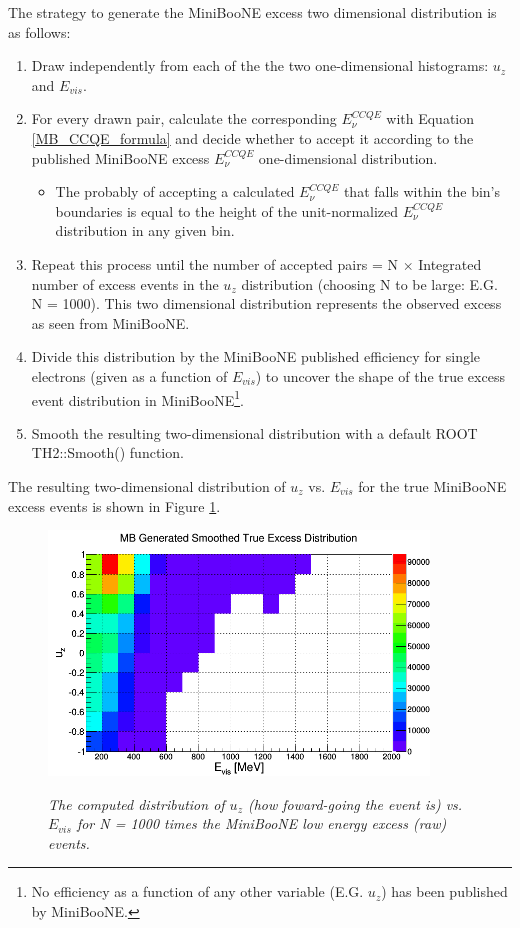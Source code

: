 The strategy to generate the MiniBooNE excess two dimensional distribution is as follows:
\begin{enumerate}
\item Draw independently from each of the the two one-dimensional histograms: $u_z$ and $E_{vis}$.
\item For every drawn pair, calculate the corresponding $E_\nu^{CCQE}$ with Equation \ref{MB_CCQE_formula} and decide whether to accept it according to the published MiniBooNE excess $E_\nu^{CCQE}$ one-dimensional distribution.
	\begin{itemize}
	\item The probably of accepting a calculated $E_\nu^{CCQE}$ that falls within the bin's boundaries is equal to the height of the unit-normalized $E_\nu^{CCQE}$ distribution in any given bin.
	\end{itemize}
\item Repeat this process until the number of accepted pairs = N $\times$ Integrated number of excess events in the $u_z$ distribution (choosing N to be large: E.G. N = 1000). This two dimensional distribution represents the observed excess as seen from MiniBooNE.
\item Divide this distribution by the MiniBooNE published efficiency for single electrons (given as a function of $E_{vis}$) to uncover the shape of the true excess event distribution in MiniBooNE\footnote{No efficiency as a function of any other variable (E.G. $u_z$) has been published by MiniBooNE.}.
\item Smooth the resulting two-dimensional distribution with a default ROOT TH2::Smooth() function.
\end{enumerate}
The resulting two-dimensional distribution of $u_z$ vs. $E_{vis}$ for the true MiniBooNE excess events is shown in Figure \ref{MBth2dfig}.


\begin{figure}[ht!]
\centering
	\includegraphics[width=0.9\textwidth]{Figures/miniboone_excess_th2d.png} \\
\caption{\textit{The computed distribution of $u_z$ (how foward-going the event is) vs. $E_{vis}$ for N = 1000 times the MiniBooNE low energy excess (raw) events.}}\label{MBth2dfig}
\end{figure}


